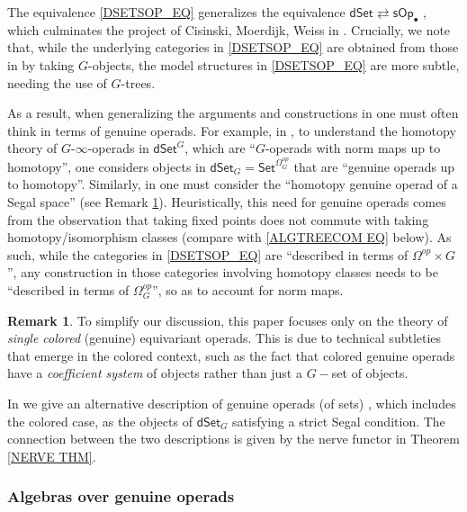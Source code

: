 \documentclass[a4paper,10pt
,draft
]{article}%
\numberwithin{equation}{section}
\numberwithin{figure}{section}
\theoremstyle{definition} %
\newtheorem{remark}[equation]{Remark}%
\newcommand{\1}{\ensuremath{\mathbbm 1}}%
\begin{document}
The equivalence \eqref{DSETSOP_EQ}
generalizes the 
equivalence
$\mathsf{dSet} \rightleftarrows \mathsf{sOp}_{\bullet}$
\cite[Thm. 8.15]{CM13b},
which culminates the project
of Cisinski, Moerdijk, Weiss in \cite{MW07,MW08,CM11,CM13a,CM13b}.
%
Crucially, we note that, 
while the underlying categories in \eqref{DSETSOP_EQ}
are obtained from those in 
\cite[Thm. 8.15]{CM13b}
by taking $G$-objects,
the model structures in \eqref{DSETSOP_EQ}
are more subtle, needing the use of $G$-trees. 

As a result, when generalizing the arguments and constructions in
\cite{MW07,MW08,CM11,CM13a,CM13b}
one must often think in terms of genuine operads.
For example, 
in \cite[\S 8.2]{Pe17},
to understand the homotopy theory of $G$-$\infty$-operads
in $\mathsf{dSet}^G$,
which are ``$G$-operads with norm maps up to homotopy'',
one considers objects \cite[Not. 8.11]{Pe17} in 
$\mathsf{dSet}_G = \mathsf{Set}^{\Omega_G^{op}}$
that are ``genuine operads up to homotopy''.
Similarly, in
\cite[\S 5]{BP_edss} one must consider the
``homotopy genuine operad of a Segal space'' 
\cite[Def. 5.8]{BP_edss}
(see Remark \ref{COLEREDGEN REM}).
Heuristically, this need for genuine operads comes from the 
observation that taking fixed points does not commute with taking 
homotopy/isomorphism classes
(compare with \eqref{ALGTREECOM EQ} below).
As such, while the categories in \eqref{DSETSOP_EQ}
are ``described in terms of $\Omega^{op} \times G$'',
any construction in those categories involving homotopy classes
needs to be ``described in terms of $\Omega_G^{op}$'',
so as to account for norm maps.

\begin{remark}\label{COLEREDGEN REM}
	To simplify our discussion, 
	this paper focuses only on the theory of 
	\emph{single colored} (genuine) equivariant operads.
	This is due to technical subtleties that emerge in the colored context, 
	such as the fact that colored genuine operads
	have a \emph{coefficient system} of objects 
	rather than just a $G-$set of objects.
	
	In \cite{BP_edss} we give an alternative description 
	of genuine operads (of sets) \cite[Def. 3.35]{BP_edss},
	which includes the colored case, 
	as the objects of $\mathsf{dSet}_G$
	satisfying a strict Segal condition.
%
	The connection between the two descriptions
	is given by the nerve functor in Theorem \ref{NERVE THM}.
\end{remark}


\subsubsection*{Algebras over genuine operads}
\end{document}
